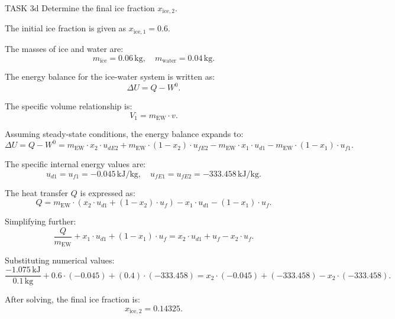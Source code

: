 TASK 3d  
Determine the final ice fraction \( x_{\text{ice},2} \).

The initial ice fraction is given as \( x_{\text{ice},1} = 0.6 \).  

The masses of ice and water are:  
\[
m_{\text{ice}} = 0.06 \, \text{kg}, \quad m_{\text{water}} = 0.04 \, \text{kg}.
\]

The energy balance for the ice-water system is written as:  
\[
\Delta U = Q - W^0.
\]

The specific volume relationship is:  
\[
V_1 = m_{\text{EW}} \cdot v.
\]

Assuming steady-state conditions, the energy balance expands to:  
\[
\Delta U = Q - W^0 = m_{\text{EW}} \cdot x_2 \cdot u_{dE2} + m_{\text{EW}} \cdot (1 - x_2) \cdot u_{fE2} - m_{\text{EW}} \cdot x_1 \cdot u_{d1} - m_{\text{EW}} \cdot (1 - x_1) \cdot u_{f1}.
\]

The specific internal energy values are:  
\[
u_{d1} = u_{f1} = -0.045 \, \text{kJ/kg}, \quad u_{fE1} = u_{fE2} = -333.458 \, \text{kJ/kg}.
\]

The heat transfer \( Q \) is expressed as:  
\[
Q = m_{\text{EW}} \cdot \left( x_2 \cdot u_{d1} + (1 - x_2) \cdot u_f \right) - x_1 \cdot u_{d1} - (1 - x_1) \cdot u_f.
\]

Simplifying further:  
\[
\frac{Q}{m_{\text{EW}}} + x_1 \cdot u_{d1} + (1 - x_1) \cdot u_f = x_2 \cdot u_{d1} + u_f - x_2 \cdot u_f.
\]

Substituting numerical values:  
\[
\frac{-1.075 \, \text{kJ}}{0.1 \, \text{kg}} + 0.6 \cdot (-0.045) + (0.4) \cdot (-333.458) = x_2 \cdot (-0.045) + (-333.458) - x_2 \cdot (-333.458).
\]

After solving, the final ice fraction is:  
\[
x_{\text{ice},2} = 0.14325.
\]